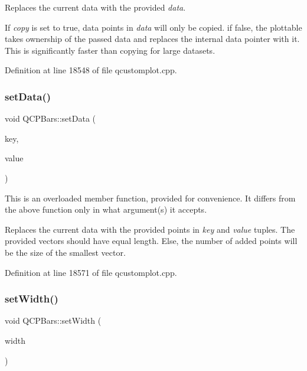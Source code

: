 Replaces the current data with the provided {\itshape data}.

If {\itshape copy} is set to true, data points in {\itshape data} will only be copied. if false, the plottable takes ownership of the passed data and replaces the internal data pointer with it. This is significantly faster than copying for large datasets. 

Definition at line 18548 of file qcustomplot.\+cpp.

\mbox{\label{class_q_c_p_bars_a3efded5df4a82ecb201f7c28099fa2e5}} 
\subsubsection{\texorpdfstring{set\+Data()}{setData()}\hspace{0.1cm}{\footnotesize\ttfamily [2/2]}}
{\footnotesize\ttfamily void Q\+C\+P\+Bars\+::set\+Data (\begin{DoxyParamCaption}\item[{const Q\+Vector$<$ double $>$ \&}]{key,  }\item[{const Q\+Vector$<$ double $>$ \&}]{value }\end{DoxyParamCaption})}

This is an overloaded member function, provided for convenience. It differs from the above function only in what argument(s) it accepts.

Replaces the current data with the provided points in {\itshape key} and {\itshape value} tuples. The provided vectors should have equal length. Else, the number of added points will be the size of the smallest vector. 

Definition at line 18571 of file qcustomplot.\+cpp.

\mbox{\label{class_q_c_p_bars_afec6116579d44d5b706e0fa5e5332507}} 
\subsubsection{\texorpdfstring{set\+Width()}{setWidth()}}
{\footnotesize\ttfamily void Q\+C\+P\+Bars\+::set\+Width (\begin{DoxyParamCaption}\item[{double}]{width }\end{DoxyParamCaption})}

